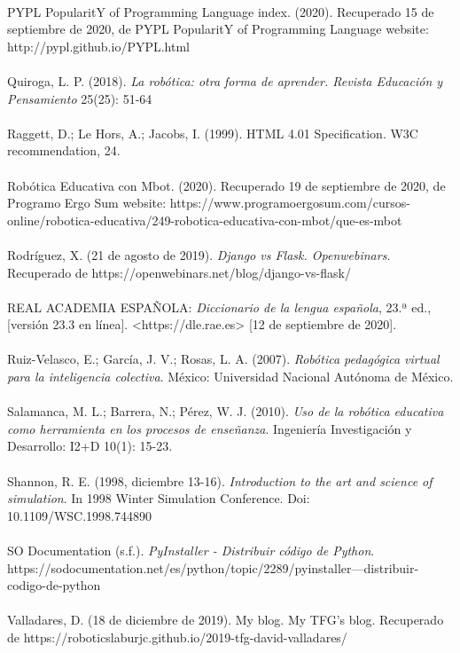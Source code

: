 \documentclass{report}
\begin{document}
\\
PYPL PopularitY of Programming Language index. (2020). Recuperado 15 de septiembre de 2020, de PYPL PopularitY of Programming Language website: http://pypl.github.io/PYPL.html
\\
\\
Quiroga, L. P. (2018). \textit{La robótica: otra forma de aprender. Revista Educación y Pensamiento} 25(25): 51-64
\\
\\
Raggett, D.; Le Hors, A.; Jacobs, I. (1999). HTML 4.01 Specification. W3C recommendation, 24.
\\
\\
Robótica Educativa con Mbot. (2020). Recuperado 19 de septiembre de 2020, de Programo Ergo Sum website: https://www.programoergosum.com/cursos-online/robotica-educativa/249-robotica-educativa-con-mbot/que-es-mbot
\\
\\
Rodríguez, X. (21 de agosto de 2019).  \textit{Django vs Flask. Openwebinars}. Recuperado de https://openwebinars.net/blog/django-vs-flask/
\\
\\
REAL ACADEMIA ESPAÑOLA: \textit{Diccionario de la lengua española}, 23.ª ed., [versión 23.3 en línea]. <https://dle.rae.es> [12 de septiembre de 2020].
\\
\\
Ruiz-Velasco, E.; García, J. V.; Rosas, L. A. (2007). \textit{Robótica pedagógica virtual para la inteligencia colectiva}. México: Universidad Nacional Autónoma de México.
\\
\\
Salamanca, M. L.; Barrera, N.; Pérez, W. J. (2010). \textit{Uso de la robótica educativa como herramienta en los procesos de enseñanza}. Ingeniería Investigación y Desarrollo: I2+D 10(1): 15-23.
\\
\\
Shannon, R. E. (1998, diciembre 13-16). \textit{Introduction to the art and science of simulation}. In 1998 Winter Simulation Conference. Doi: 10.1109/WSC.1998.744890
\\
\\
SO Documentation (s.f.).  \textit{PyInstaller - Distribuir código de Python}.  https://sodocumentation.net/es/python/topic/2289/pyinstaller---distribuir-codigo-de-python
\\
\\
Valladares, D. (18 de diciembre de 2019). My blog. My TFG’s blog. Recuperado de https://roboticslaburjc.github.io/2019-tfg-david-valladares/
\end{document}
